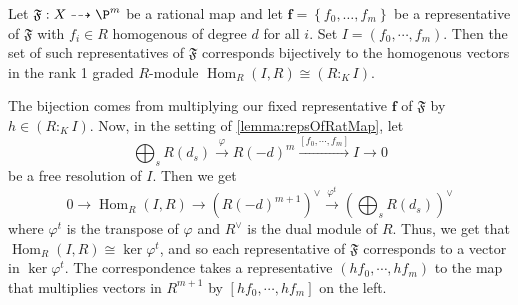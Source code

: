 \documentclass[11pt]{amsart}
\numberwithin{equation}{theorem}
\renewcommand{\:}{\colon}
\DeclareMathOperator{\homgp}{Hom}
\DeclareMathOperator{\Projfnc}{Proj} %
\theoremstyle{theorem}
\begin{document}


%

\begin{proposition}\textnormal{\cite[Proposition 1.1]{SimisCremona}}
  Let $\mathfrak{F}: X \dashrightarrow \P^m$ be a rational map and let $\textbf{f} = \left\{ f_0, \dots, f_m \right\}$ be a representative of $\mathfrak{F}$ with $f_i\in R$ homogenous of degree $d$ for all $i$. Set $I  = (f_0, \cdots, f_m)$. Then the set of such representatives of $\mathfrak{F}$ corresponds bijectively to the homogenous vectors in the rank 1 graded $R$-module $\homgp_R(I, R) \cong (R :_K I)$.
  \label{lemma:repsOfRatMap}
\end{proposition}

The bijection comes from multiplying our fixed representative $\textbf{f}$ of $\mathfrak{F}$ by $h \in (R :_K I)$.
Now, in the setting of \autoref{lemma:repsOfRatMap}, let
  \[
    \bigoplus_s R(d_s) \xrightarrow{\varphi} R(-d)^m \xrightarrow{[f_0, \cdots, f_m]} I \to 0
  \]
be a free resolution of $I$. Then we get
\[
  0 \to \homgp_R(I, R) \to \left( R(-d)^{m+1} \right)^\vee \xrightarrow{\varphi^t} \left( \bigoplus_s R(d_s) \right)^\vee
\]
where $\varphi^t$ is the transpose of $\varphi$ and $R^\vee$ is the dual module of $R$. Thus, we get that $\homgp_R(I,R) \cong \ker \varphi^t$, and so each representative of $\mathfrak{F}$ corresponds to a vector in $\ker \varphi^t$. The correspondence takes a representative $(hf_0, \cdots, hf_m)$ to the map that multiplies vectors in $R^{m+1}$ by $[hf_0, \cdots, hf_m]$ on the left.
\end{document}
